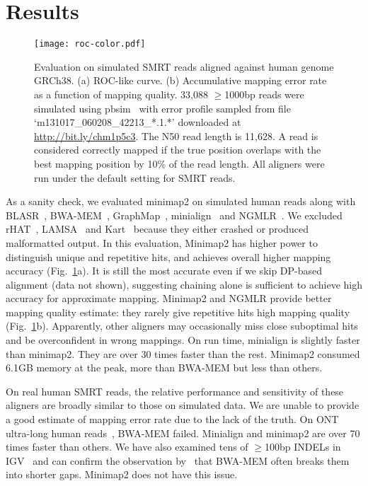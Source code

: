 \documentclass{bioinfo}
\begin{document}
\section{Results}
\begin{figure}[!tb]
\centering
\texttt{[image: roc-color.pdf]}
\caption{Evaluation on simulated SMRT reads aligned against human genome
GRCh38. (a) ROC-like curve. (b) Accumulative mapping error rate as a function
of mapping quality. 33,088 $\ge$1000bp reads were simulated using
pbsim~\citep{Ono:2013aa} with error profile sampled from file
`m131017\_060208\_42213\_*.1.*' downloaded at
\href{http://bit.ly/chm1p5c3}{http://bit.ly/chm1p5c3}. The N50 read length is
11,628. A read is considered correctly mapped if the true position overlaps
with the best mapping position by 10\% of the read length. All aligners were
run under the default setting for SMRT reads.}\label{fig:eval}
\end{figure}

As a sanity check, we evaluated minimap2 on simulated human reads along with
BLASR~\citep{Chaisson:2012aa}, 
BWA-MEM~\citep{Li:2013aa},
GraphMap~\citep{Sovic:2016aa},
minialign~\citep{Suzuki:2016} and
NGMLR~\citep{Sedlazeck169557}. We excluded rHAT~\citep{Liu:2016ab},
LAMSA~\citep{Liu:2017aa} and Kart~\citep{Lin:2017aa} because they either
crashed or produced malformatted output. In this evaluation, Minimap2 has
higher power to distinguish unique and repetitive hits, and achieves overall
higher mapping accuracy (Fig.~\ref{fig:eval}a). It is still the most accurate
even if we skip DP-based alignment (data not shown), suggesting chaining alone
is sufficient to achieve high accuracy for approximate mapping. Minimap2 and
NGMLR provide better mapping quality estimate: they rarely give repetitive hits
high mapping quality (Fig.~\ref{fig:eval}b).  Apparently, other aligners may
occasionally miss close suboptimal hits and be overconfident in wrong mappings.
On run time, minialign is slightly faster than minimap2. They are over 30 times
faster than the rest.  Minimap2 consumed 6.1GB memory at the peak, more than
BWA-MEM but less than others.

On real human SMRT reads, the relative performance and sensitivity of
these aligners are broadly similar to those on simulated data. We are unable to
provide a good estimate of mapping error rate due to the lack of the truth.  On
ONT ultra-long human reads~\citep{Jain128835}, BWA-MEM failed. Minialign and
minimap2 are over 70 times faster than others. We have also examined tens of
$\ge$100bp INDELs in IGV~\citep{Robinson:2011aa} and can confirm the
observation by~\citet{Sedlazeck169557} that BWA-MEM often breaks them into
shorter gaps. Minimap2 does not have this issue.
\end{document}
